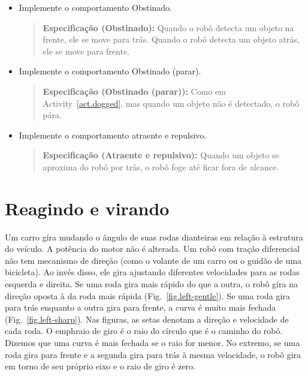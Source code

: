 \begin{framed}
\begin{itemize}
\item Implemente o comportamento Obstinado.
\begin{quote}
\normalsize\noindent\textbf{Especificação (Obstinado):} Quando o robô detecta um objeto na frente, ele se move para trás. Quando o robô detecta um objeto atrás, ele se move para frente.
\end{quote}
\end{itemize}
\end{framed}

\begin{framed}
\begin{itemize}
\item Implemente o comportamento Obstinado (parar).
\begin{quote}
\normalsize\noindent\textbf{Especificação (Obstinado (parar)):} Como em Activity~\ref{act.dogged}, mas quando um objeto não é detectado, o robô pára.
\end{quote}
\end{itemize}
\end{framed}

\begin{framed}
\begin{itemize}
\item Implemente o comportamento atraente e repulsivo.
\begin{quote}
\normalsize\noindent\textbf{Especificação (Atraente e repulsivo):} Quando um objeto se aproxima do robô por trás, o robô foge até ficar fora de alcance.
\end{quote}
\end{itemize}
\end{framed}

\section{Reagindo e virando}\label{s.turning}

Um carro gira mudando o ângulo de suas rodas dianteiras em relação à estrutura do veículo. A potência do motor não é alterada. Um robô com tração diferencial não tem mecanismo de direção (como o volante de um carro ou o guidão de uma bicicleta). Ao invés disso, ele gira ajustando diferentes velocidades para as rodas esquerda e direita. Se uma roda gira mais rápido do que a outra, o robô gira na direção oposta à da roda mais rápida (Fig.~\ref{fig.left-gentle}). Se uma roda gira para trás enquanto a outra gira para frente, a curva é muito mais fechada (Fig.~\ref{fig.left-sharp}). Nas figuras, as setas denotam a direção e velocidade de cada roda. O emph{raio de giro} é o raio do círculo que é o caminho do robô. Dizemos que uma curva é mais fechada se o raio for menor. No extremo, se uma roda gira para frente e a segunda gira para trás à mesma velocidade, o robô gira em torno de seu próprio eixo e o raio de giro é zero.

